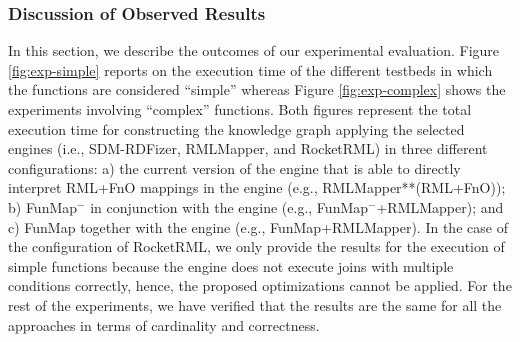 \subsubsection{Discussion of Observed Results}
In this section, we describe the outcomes of our experimental evaluation. Figure \ref{fig:exp-simple} reports on the execution time of the different testbeds in which the functions are considered ``simple'' whereas Figure \ref{fig:exp-complex} shows the experiments involving ``complex'' functions. Both figures represent the total execution time for constructing the knowledge graph applying the selected engines (i.e., SDM-RDFizer, RMLMapper, and RocketRML) in three different configurations: a) the current version of the engine that is able to directly interpret RML+FnO mappings in the engine (e.g., RMLMapper**(RML+FnO)); b) FunMap$^-$ in conjunction with the engine (e.g., FunMap$^-$+RMLMapper); and c) FunMap together with the engine (e.g., FunMap+RMLMapper). In the case of the configuration of RocketRML, we only provide the results for the execution of simple functions because the engine does not execute joins with multiple conditions correctly, hence, the proposed optimizations cannot be applied. For the rest of the experiments, we have verified that the results are the same for all the approaches in terms of cardinality and correctness. 
